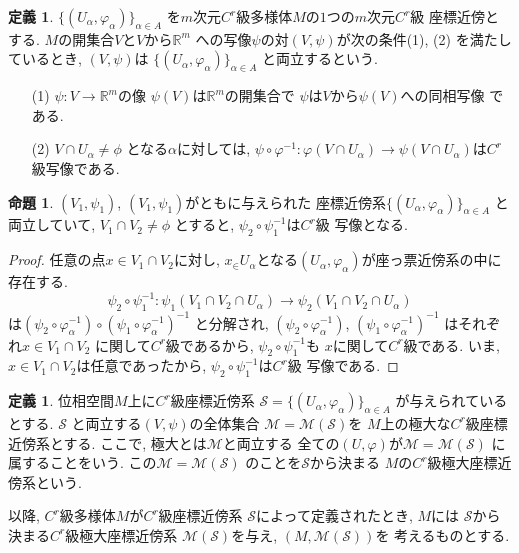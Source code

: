 \documentclass[a4j,12pt]{jarticle}
\theoremstyle{definition}
\newtheorem{definition}[theorem]{定義}
\newtheorem{proposition}[theorem]{命題}
\begin{document}
\begin{definition}
    $\{(U_\alpha ,\varphi _\alpha)\}_{\alpha \in A}$
    を$m$次元$C^r$級多様体$M$の$1$つの$m$次元$C^r$級
    座標近傍とする. $M$の開集合$V$と$V$から$\mathbb{R}^m$
    への写像$\psi$の対$(V,\psi)$が次の条件(1), (2)
    を満たしているとき, $(V,\psi)$は
    $\{(U_\alpha ,\varphi _\alpha)\}_{\alpha \in A}$
    と両立するという. 
    \begin{itemize}
        \item[(1)]$\psi:V\to \mathbb{R}^m$の像
        $\psi (V)$は$\mathbb{R}^m$の開集合で
        $\psi$は$V$から$\psi (V)$への同相写像
        である. 
        \item[(2)] $V\cap U_\alpha \neq \phi$
        となる$\alpha$に対しては, 
        $\psi \circ \varphi ^{-1}:
        \varphi(V\cap U_\alpha)\to
        \psi(V\cap U_\alpha)$は$C^r$級写像である. 
    \end{itemize}
\begin{proposition}
    $(V_1,\psi_1)$, $(V_1,\psi_1)$がともに与えられた
    座標近傍系$\{(U_\alpha ,
    \varphi _\alpha)\}_{\alpha \in A}$
    と両立していて, $V_1\cap V_2\neq \phi$
    とすると, $\psi_2\circ \psi_1^{-1}$は$C^r$級
    写像となる. 
\end{proposition}
\begin{proof}
    任意の点$x\in V_1\cap V_2$に対し, 
    $x_\in U_\alpha$となる$(U_\alpha, 
    \varphi_\alpha)$が座っ票近傍系の中に
    存在する. 
    $$\psi_2\circ \psi_1^{-1}:
    \psi_1(V_1\cap V_2\cap U_\alpha)\to
    \psi_2(V_1\cap V_2\cap U_\alpha)$$
    は$(\psi_2\circ \varphi_\alpha^{-1})\circ
    (\psi_1\circ \varphi_\alpha^{-1})^{-1}$
    と分解され, 
    $(\psi_2\circ \varphi_\alpha^{-1})$, 
    $(\psi_1\circ \varphi_\alpha^{-1})^{-1}$
    はそれぞれ$x\in V_1\cap V_2$
    に関して$C^r$級であるから, 
    $\psi_2\circ \psi_1^{-1}$も
    $x$に関して$C^r$級である. いま, 
    $x\in V_1\cap V_2$は任意であったから, 
    $\psi_2\circ \psi_1^{-1}$は$C^r$級
    写像である. 
\end{proof}
\begin{definition}
    位相空間$M$上に$C^r$級座標近傍系
    $\mathcal{S}=
    \{(U_\alpha, \varphi_\alpha)\}_{\alpha\in A}$
    が与えられているとする. 
    $\mathcal{S}$
    と両立する$(V,\psi)$の全体集合
    $\mathcal{M}=\mathcal{M}(\mathcal{S})$を
    $M$上の極大な$C^r$級座標近傍系とする. 
    ここで, 極大とは$\mathcal{M}$と両立する
    全ての$(U,\varphi)$が$\mathcal{M}
    =\mathcal{M}(\mathcal{S})$
    に属することをいう. この$\mathcal{M}
    =\mathcal{M}(\mathcal{S})$
    のことを$\mathcal{S}$から決まる
    $M$の$C^r$級極大座標近傍系という. 
\end{definition}
以降, $C^r$級多様体$M$が$C^r$級座標近傍系
$\mathcal{S}$によって定義されたとき, $M$には
$\mathcal{S}$から決まる$C^r$級極大座標近傍系
$\mathcal{M}(\mathcal{S})$を与え, 
$(M,\mathcal{M}(\mathcal{S}))$を
考えるものとする. 
\end{definition}
\end{document}
